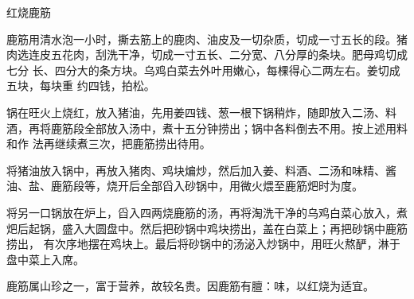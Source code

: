 \begin{recipe}{红烧鹿筋}

\ingredients


\preparation

\step 鹿筋用清水泡一小时，撕去筋上的鹿肉、油皮及一切杂质，切成一寸五长的段。猪
肉选连皮五花肉，刮洗干净，切成一寸五长、二分宽、八分厚的条块。肥母鸡切成七分
长、四分大的条方块。乌鸡白菜去外叶用嫩心，每棵得心二两左右。姜切成五块，每块重
约四钱，拍松。

\step 锅在旺火上烧红，放入猪油，先用姜四钱、葱一根下锅稍炸，随即放入二汤、料
酒，再将鹿筋段全部放入汤中，煮十五分钟捞出；锅中各料倒去不用。按上述用料和作
法再继续煮三次，把鹿筋捞出待用。

\step 将猪油放入锅中，再放入猪肉、鸡块煸炒，然后加入姜、料酒、二汤和味精、酱
油、盐、鹿筋段等，烧开后全部舀入砂锅中，用微火煨至鹿筋𤆵时为度。

\step 将另一口锅放在炉上，舀入四两烧鹿筋的汤，再将淘洗干净的乌鸡白菜心放入，煮
𤆵后起锅，盛入大圆盘中。然后把砂锅中鸡块捞出，盖在白菜上；再把砂锅中鹿筋捞出，
有次序地摆在鸡块上。最后将砂锅中的汤泌入炒锅中，用旺火熬酽，淋于盘中菜上入席。

\features

鹿筋属山珍之一，富于营养，故较名贵。因鹿筋有膻：味，以红烧为适宜。

\end{recipe}

